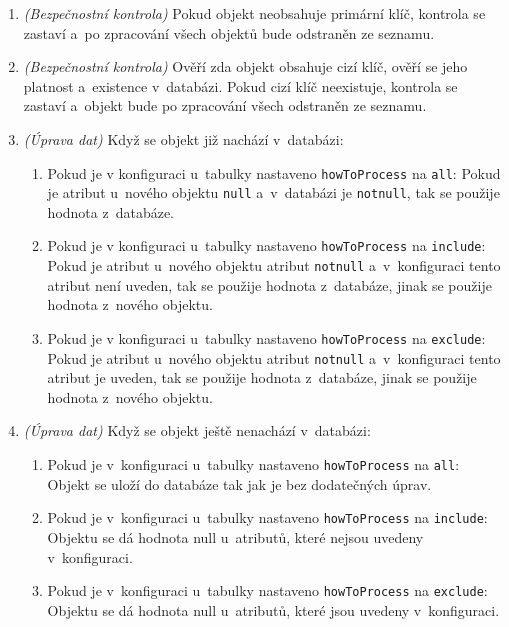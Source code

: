 \begin{enumerate}
    \item \textit{(Bezpečnostní kontrola)} Pokud objekt neobsahuje primární klíč, kontrola se zastaví a~po 
    zpracování všech objektů bude odstraněn ze seznamu.
    \item \textit{(Bezpečnostní kontrola)} Ověří zda objekt obsahuje cizí klíč, ověří se jeho platnost a~existence v~databázi.
    Pokud cizí klíč neexistuje, kontrola se zastaví a~objekt bude po zpracování všech odstraněn ze seznamu.
    \item \textit{(Úprava dat)} Když se objekt již nachází v~databázi:
    \begin{enumerate}
        \item Pokud je v konfiguraci u~tabulky nastaveno \texttt{howToProcess} na \texttt{all}:
        Pokud je atribut u~nového objektu \texttt{null} a~v~databázi je \texttt{notnull}, tak se použije hodnota z~databáze.
        \item Pokud je v konfiguraci u~tabulky nastaveno \texttt{howToProcess} na \texttt{include}:
        Pokud je atribut u~nového objektu atribut \texttt{notnull} a~v~konfiguraci tento atribut není uveden, tak se použije hodnota z~databáze,
        jinak se použije hodnota z~nového objektu.
        \item Pokud je v konfiguraci u~tabulky nastaveno \texttt{howToProcess} na \texttt{exclude}:
        Pokud je atribut u~nového objektu atribut \texttt{notnull} a~v~konfiguraci tento atribut je uveden, tak se použije hodnota z~databáze,
        jinak se použije hodnota z~nového objektu.
    \end{enumerate}

    \item \textit{(Úprava dat)} Když se objekt ještě nenachází v~databázi:
    \begin{enumerate}
        \item Pokud je v~konfiguraci u~tabulky nastaveno \texttt{howToProcess} na \texttt{all}:
        Objekt se uloží do databáze tak jak je bez dodatečných úprav.
        \item Pokud je v~konfiguraci u~tabulky nastaveno \texttt{howToProcess} na \texttt{include}:
        Objektu se dá hodnota null u~atributů, které nejsou uvedeny v~konfiguraci.
        \item Pokud je v~konfiguraci u~tabulky nastaveno \texttt{howToProcess} na \texttt{exclude}:
        Objektu se dá hodnota null u~atributů, které jsou uvedeny v~konfiguraci.
    \end{enumerate}
\end{enumerate}

